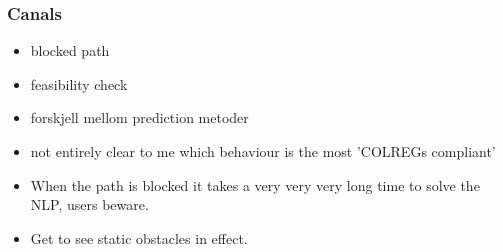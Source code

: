 \subsubsection{Canals}
\begin{itemize}
    \item blocked path
    \item feasibility check
    \item forskjell mellom prediction metoder
    \item not entirely clear to me which behaviour is the most 'COLREGs compliant'
    \item When the path is blocked it takes a very very very long time to solve the NLP, users beware.
    \item Get to see static obstacles in effect.
\end{itemize}

